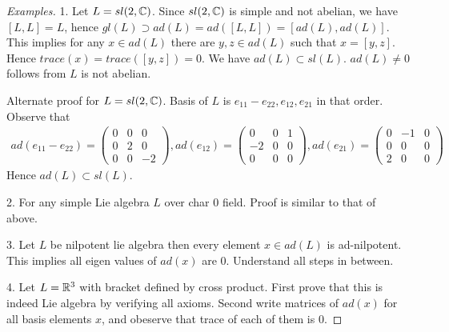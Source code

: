 \begin{proof}[Examples]
1. Let \(L=sl(2,\mathbb{C})\). Since \(sl(2,\mathbb{C})\) is simple and not abelian, we have \([L,L] = L\), hence \(gl(L)\supset ad(L) = ad([L,L])=[ad(L),ad(L)]\). This implies for any \(x \in ad(L)\) there are \(y,z \in ad(L)\) such that \(x = [y,z]\). Hence \(trace(x) = trace([y,z]) = 0\). We have \(ad(L)\subset sl(L)\). \(ad(L) \not= 0\) follows from \(L\) is not abelian.

Alternate proof for \(L=sl(2,\mathbb{C})\). Basis of \(L\) is \(e_{11}-e_{22},e_{12},e_{21}\) in that order. Observe that 
    \begin{align*}
        ad(e_{11}-e_{22}) = 
        \left(\begin{array}{ccc}
            0 & 0 & 0\\
            0 & 2 & 0\\
            0 & 0 & -2
        \end{array}\right),
        ad(e_{12}) = 
        \left(\begin{array}{ccc}
            0 & 0 & 1\\
            -2 & 0 & 0\\
            0 & 0 & 0
        \end{array}\right),
        ad(e_{21}) = 
        \left(\begin{array}{ccc}
            0 & -1 & 0\\
            0 & 0 & 0\\
            2 & 0 & 0
        \end{array}\right)
    \end{align*}
    Hence \(ad(L)\subset sl(L)\). 

    2. For any simple Lie algebra \(L\) over char 0 field. Proof is similar to that of above.

    3. Let \(L\) be nilpotent lie algebra then every element \(x \in ad(L)\) is ad-nilpotent. This implies all eigen values of \(ad(x)\) are 0. Understand all steps in between.

    4. Let \(L=\mathbb{R}^3\) with bracket defined by cross product. First prove that this is indeed Lie algebra by verifying all axioms. Second write matrices of \(ad(x)\) for all basis elements \(x\), and obeserve that trace of each of them is 0.
\end{proof}

